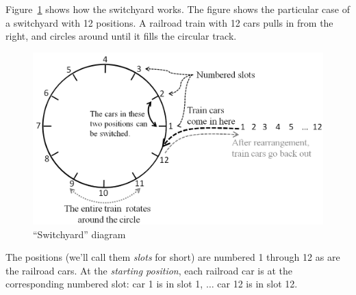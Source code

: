 Figure~\ref{fig:switchyard} shows how the switchyard works. The figure shows the particular case of a switchyard with 12 positions. A railroad train with 12 cars pulls in from the right, and circles around until it fills the circular track. 
\begin{figure}[ht]
\begin{center}
\includegraphics[width=4.5in]{images/switchyard.png}
\caption{``Switchyard'' diagram}\label{fig:switchyard}
\end{center}
\end{figure}

The positions (we'll call them \emph{slots} for short)  are numbered 1 through 12 as are the railroad cars. At the \emph{starting position}, each railroad car is at the corresponding numbered slot: car 1 is in slot 1, $\ldots$ car 12 is in slot 12.

